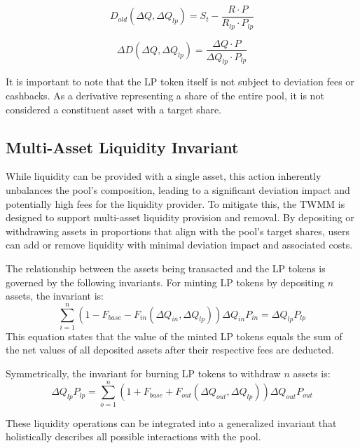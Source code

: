 \begin{equation}
	\label{eq:old_deviation_function_formula_for_lp}
	D_{old}(\Delta Q, \Delta Q_{lp}) = S_t - \frac{R \cdot P}{R_{lp} \cdot P_{lp}}
\end{equation}	

\begin{equation}
	\label{eq:deviation_delta_function_formula_for_lp}
	\Delta D(\Delta Q, \Delta Q_{lp}) = \frac{\Delta Q \cdot P}{\Delta Q_{lp} \cdot P_{lp}} 
\end{equation}	

It is important to note that the LP token itself is not subject to deviation fees or cashbacks. As a derivative representing a share of the entire pool, it is not considered a constituent asset with a target share.

\subsection{Multi-Asset Liquidity Invariant}
While liquidity can be provided with a single asset, this action inherently unbalances the pool's composition, leading to a significant deviation impact and potentially high fees for the liquidity provider. To mitigate this, the TWMM is designed to support multi-asset liquidity provision and removal. By depositing or withdrawing assets in proportions that align with the pool's target shares, users can add or remove liquidity with minimal deviation impact and associated costs.

The relationship between the assets being transacted and the LP tokens is governed by the following invariants. For minting LP tokens by depositing $n$ assets, the invariant is:
\begin{equation}
	\label{eq:invariant_lp_mint}
	\sum_{i=1}^{n} 
	(1 -  F_{base} - F_{in}(\Delta Q_{in}, \Delta Q_{lp})) \Delta Q_{in} P_{in}  
	= 
	\Delta Q_{lp} P_{lp} 
\end{equation}
This equation states that the value of the minted LP tokens equals the sum of the net values of all deposited assets after their respective fees are deducted.

Symmetrically, the invariant for burning LP tokens to withdraw $n$ assets is:
\begin{equation}
	\label{eq:invariant_lp_mint}
	\Delta Q_{lp} P_{lp}  =
	\sum_{o=1}^{n} 
	(1 + F_{base} + F_{out}(\Delta Q_{out}, \Delta Q_{lp})) \Delta Q_{out} P_{out}  
\end{equation}

These liquidity operations can be integrated into a generalized invariant that holistically describes all possible interactions with the pool.